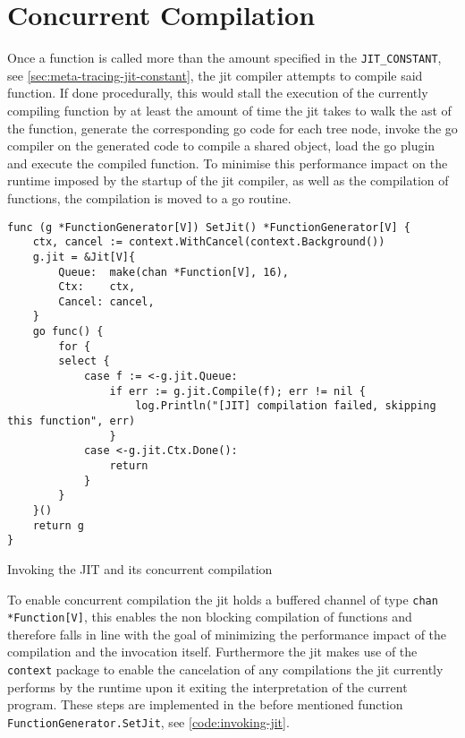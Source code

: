 \section{Concurrent Compilation}
\label{sec:concurrent-compilation}

Once a function is called more than the amount specified in the
\texttt{JIT\_CONSTANT}, see \autoref{sec:meta-tracing-jit-constant}, the jit
compiler attempts to compile said function. If done procedurally, this would
stall the execution of the currently compiling function by at least the amount
of time the jit takes to walk the ast of the function, generate the
corresponding go code for each tree node, invoke the go compiler on the
generated code to compile a shared object, load the go plugin and execute the
compiled function. To minimise this performance impact on the runtime imposed
by the startup of the jit compiler, as well as the compilation of functions,
the compilation is moved to a go routine.

\begin{listing}[H]
    \begin{verbatim}
func (g *FunctionGenerator[V]) SetJit() *FunctionGenerator[V] {
    ctx, cancel := context.WithCancel(context.Background())
    g.jit = &Jit[V]{
        Queue:  make(chan *Function[V], 16),
        Ctx:    ctx,
        Cancel: cancel,
    }
    go func() {
        for {
        select {
            case f := <-g.jit.Queue:
                if err := g.jit.Compile(f); err != nil {
                    log.Println("[JIT] compilation failed, skipping this function", err)
                }
            case <-g.jit.Ctx.Done():
                return
            }
        }
    }()
    return g
}
    \end{verbatim}
    \caption{Invoking the JIT and its concurrent compilation}
    \label{code:invoking-jit}
\end{listing}

To enable concurrent compilation the jit holds a buffered channel of type
\texttt{chan *Function[V]}, this enables the non blocking compilation
of functions and therefore falls in line with the goal of minimizing the
performance impact of the compilation and the invocation itself. Furthermore
the jit makes use of the \texttt{context} package to enable the cancelation of
any compilations the jit currently performs by the runtime upon it exiting the
interpretation of the current program. These steps are implemented in the
before mentioned function \texttt{FunctionGenerator.SetJit}, see
\autoref{code:invoking-jit}. 

